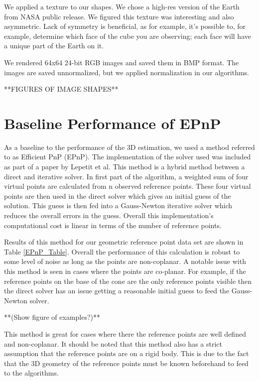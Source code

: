 \documentclass[journal]{IEEEtran}
\begin{document}
We applied a texture to our shapes. We chose a high-res version of the Earth from NASA public release. We figured this texture was interesting and also asymmetric. Lack of symmetry is beneficial, as for example, it's possible to, for example, determine which face of the cube you are observing; each face will have a unique part of the Earth on it.

We rendered 64x64 24-bit RGB images and saved them in BMP format. The images are saved unnormalized, but we applied normalization in our algorithms.

**FIGURES OF IMAGE SHAPES**

\section{Baseline Performance of EPnP}

 As a baseline to the performance of the 3D estimation, we used a method referred to as Efficient PnP (EPnP). The implementation of the solver used was included as part of a paper by Lepetit et al\cite{EPnP}. This method is a hybrid method between a direct and iterative solver. In first part of the algorithm, a weighted sum of four virtual points are calculated from n observed reference points. These four virtual points are then used in the direct solver which gives an initial guess of the solution. This guess is then fed into a Gauss-Newton iterative solver which reduces the overall errors in the guess. Overall this implementation's computational cost is linear in terms of the number of reference points.
 
 Results of this method for our geometric reference point data set are shown in Table \ref{EPnP_Table}. Overall the performance of this calculation is robust to some level of noise as long as the points are non-coplanar. A notable issue with this method is seen in cases where the points are co-planar. For example, if the reference points on the base of the cone are the only reference points visible then the direct solver has an issue getting a reasonable initial guess to feed the Gauss-Newton solver.
 
 **(Show figure of examples?)**
 
 This method is great for cases where there the reference points are well defined and non-coplanar. It should be noted that this method also has a strict assumption that the reference points are on a rigid body. This is due to the fact that the 3D geometry of the reference points must be known beforehand to feed to the algorithms. 
 
\end{document}
